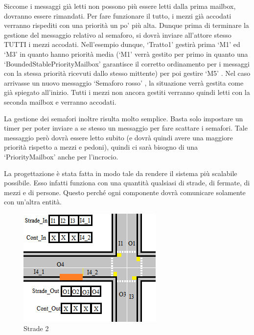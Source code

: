 \documentclass{article}
\begin{document}
Siccome i messaggi gi\`{a} letti non possono pi\`{u} essere letti dalla prima mailbox, dovranno essere rimandati. Per fare funzionare il tutto, i mezzi gi\`{a} accodati verranno rispediti con una priorit\`{a} un po\textquoteright{} pi\`{u} alta. Dunque prima di terminare la gestione del messaggio relativo al semaforo, si dovr\`{a} inviare all\textquoteright{}attore stesso TUTTI i mezzi accodati. Nell\textquoteright{}esempio dunque, \lq Tratto1\rq{} gestir\`{a} prima \lq M1\rq{} ed \lq M3\rq{} in quanto hanno priorit\`{a} media (\lq M1\rq{} verr\`{a} gestito per primo in quanto una \lq BoundedStablePriorityMailbox\rq{} garantisce il corretto ordinamento per i messaggi con la stessa priorit\`{a} ricevuti dallo stesso mittente) per poi gestire \lq M5\rq{} . Nel caso arrivasse un nuovo messaggio \lq Semaforo rosso\rq{} , la situazione verr\`{a} gestita come gi\`{a} spiegato all\textquoteright{}inizio. Tutti i mezzi non ancora gestiti verranno quindi letti con la seconda mailbox e verranno accodati.
\par La gestione dei semafori inoltre risulta molto semplice. Basta solo impostare un timer per poter inviare a se stesso un messaggio per fare scattare i semafori. Tale messaggio per\`{o} dovr\`{a} essere letto subito (e dovr\`{a} quindi avere una maggiore priorit\`{a} rispetto a mezzi e pedoni), quindi ci sar\`{a} bisogno di una \lq PriorityMailbox\rq{} anche per l\textquoteright{}incrocio.
\par La progettazione \`{e} stata fatta in modo tale da rendere il sistema pi\`{u} scalabile possibile. Esso infatti funziona con una quantit\`{a} qualsiasi di strade, di fermate, di mezzi e di persone. Questo perch\'{e} ogni componente dovr\`{a} comunicare solamente con un\textquoteright{}altra entit\`{a}.
\begin{figure}[H]
\begin{center}
\includegraphics{./img/Strade2.png}
\caption{Strade 2}
\label{fig:Strade 2}
\end{center}
\end{figure}
\end{document}
